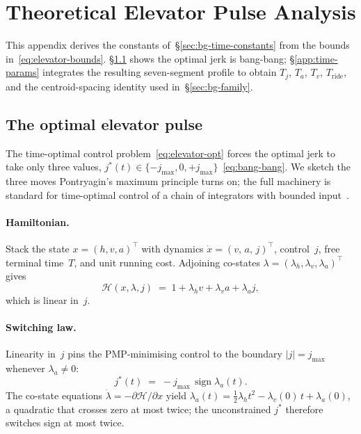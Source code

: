 \documentclass[manuscript,review,screen]{acmart}
\begin{document}



\appendix

\section{Theoretical Elevator Pulse Analysis}
\label{app:derivations}

This appendix derives the constants of~\S\ref{sec:bg-time-constants}
from the bounds in~\eqref{eq:elevator-bounds}.
\S\ref{app:bangbang} shows the optimal jerk is bang-bang;
\S\ref{app:time-params} integrates the resulting seven-segment
profile to obtain $T_j$, $T_a$, $T_v$, $T_{\text{ride}}$, and the
centroid-spacing identity used in~\S\ref{sec:bg-family}.

\subsection{The optimal elevator pulse}
\label{app:bangbang}

The time-optimal control problem~\eqref{eq:elevator-opt} forces the
optimal jerk to take only three values,
$j^{*}(t)\!\in\!\{-j_{\max},0,+j_{\max}\}$~\eqref{eq:bang-bang}.  We
sketch the three moves Pontryagin's maximum principle turns on; the
full machinery is standard for time-optimal control of a chain of
integrators with bounded input~\cite{athans1966,kirk2004}.

\paragraph{Hamiltonian.}
Stack the state $x=(h,v,a)^{\top}$ with dynamics
$\dot x=(v,\,a,\,j)^{\top}$, control~$j$, free terminal time~$T$,
and unit running cost.  Adjoining co-states
$\lambda=(\lambda_h,\lambda_v,\lambda_a)^{\top}$ gives
\[
  \mathcal H(x,\lambda,j)
  \;=\; 1 + \lambda_h v + \lambda_v a + \lambda_a j,
\]
which is linear in~$j$.

\paragraph{Switching law.}
Linearity in~$j$ pins the PMP-minimising control to the boundary
$|j|=j_{\max}$ whenever $\lambda_a\!\neq\!0$:
\[
  j^{*}(t)\;=\;-j_{\max}\,\operatorname{sign}\lambda_a(t).
\]
The co-state equations $\dot\lambda=-\partial\mathcal H/\partial x$
yield
$\lambda_a(t)=\tfrac12\lambda_h t^{2}-\lambda_v(0)\,t+\lambda_a(0)$,
a quadratic that crosses zero at most twice; the unconstrained
$j^{*}$ therefore switches sign at most twice.
\end{document}
